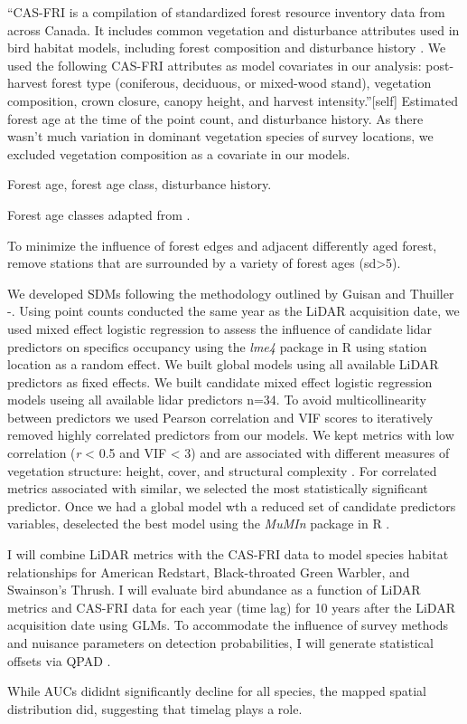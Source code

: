 \documentclass[preprint, 3p,
authoryear]{elsarticle} %
\begin{document}
``CAS-FRI is a compilation of standardized forest resource inventory
data from across Canada. It includes common vegetation and disturbance
attributes used in bird habitat models, including forest composition and
disturbance history \citep{Cumming2011a}. We used the following CAS-FRI
attributes as model covariates in our analysis: post-harvest forest type
(coniferous, deciduous, or mixed-wood stand), vegetation composition,
crown closure, canopy height, and harvest intensity.''{[}self{]}
Estimated forest age at the time of the point count, and disturbance
history. As there wasn't much variation in dominant vegetation species
of survey locations, we excluded vegetation composition as a covariate
in our models.

Forest age, forest age class, disturbance history.

Forest age classes adapted from \citet{chen2002dynamics}.

To minimize the influence of forest edges and adjacent differently aged
forest, remove stations that are surrounded by a variety of forest ages
(sd\textgreater5).

We developed SDMs following the methodology outlined by Guisan and
Thuiller -\citet{Guisan2005}. Using point counts conducted the same year
as the LiDAR acquisition date, we used mixed effect logistic regression
to assess the influence of candidate lidar predictors on specifics
occupancy using the \emph{lme4} package in
R\citep{batesFittingLinearMixedeffects2015} using station location as a
random effect. We built global models using all available LiDAR
predictors as fixed effects. We built candidate mixed effect logistic
regression models useing all available lidar predictors n=34. To avoid
multicollinearity between predictors we used Pearson correlation and VIF
scores to iteratively removed highly correlated predictors from our
models. We kept metrics with low correlation (\emph{r} \textless{} 0.5
and VIF \textless{} 3) and are associated with different measures of
vegetation structure: height, cover, and structural complexity
\citep{valbuenaStandardizingEcosystemMorphological2020}. For correlated
metrics associated with similar, we selected the most statistically
significant predictor. Once we had a global model wth a reduced set of
candidate predictors variables, deselected the best model using the
\emph{MuMIn} package in R \citet{bartonMuMInMultimodelInference2020}.

I will combine LiDAR metrics with the CAS-FRI data to model species
habitat relationships for American Redstart, Black-throated Green
Warbler, and Swainson's Thrush. I will evaluate bird abundance as a
function of LiDAR metrics and CAS-FRI data \citep{MacKenzie2006} for
each year (time lag) for 10 years after the LiDAR acquisition date using
GLMs. To accommodate the influence of survey methods and nuisance
parameters on detection probabilities, I will generate statistical
offsets via QPAD \citep{SolymosMatsuoka2013}.

While AUCs dididnt significantly decline for all species, the mapped
spatial distribution did, suggesting that timelag plays a role.


\end{document}
